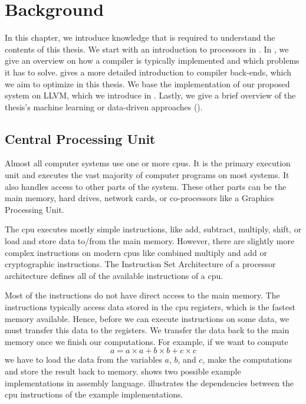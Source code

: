 \chapter{Background}
In this chapter, we introduce knowledge that is required to understand the contents of this thesis.
We start with an introduction to processors in .
In , we give an overview on how a compiler is typically implemented and which problems it has to solve.
 gives a more detailed introduction to compiler back-ends, which we aim to optimize in this thesis.
We base the implementation of our proposed system on LLVM, which we introduce in .
Lastly, we give a brief overview of the thesis's machine learning or data-driven approaches ().


% 

\section{Central Processing Unit}
\label{sec:bg:cpu}
Almost all computer systems use one or more \acp{cpu}.
It is the primary execution unit and executes the vast majority of computer programs on most systems.
It also handles access to other parts of the system.
These other parts can be the main memory, hard drives, network cards, or co-processors like a Graphics Processing Unit.

The \ac{cpu} executes mostly simple instructions, like add, subtract, multiply, shift, or load and store data to/from the main memory.
However, there are slightly more complex instructions on modern \acp{cpu} like combined multiply and add or cryptographic instructions.
The Instruction Set Architecture of a processor architecture defines all of the available instructions of a \ac{cpu}.

Most of the instructions do not have direct access to the main memory.
The instructions typically access data stored in the \ac{cpu} registers, which is the fastest memory available.
Hence, before we can execute instructions on some data, we must transfer this data to the registers.
We transfer the data back to the main memory once we finish our computations.
For example, if we want to compute 
\begin{equation}
    a=a\times a+b\times b+c\times c
    \label{eqn:bg:abc}
\end{equation}
we have to load the data from the variables $a$, $b$, and $c$, make the computations and store the result back to memory.
 shows two possible example implementations in assembly language.
 illustrates the dependencies between the \ac{cpu} instructions of the example implementations.

